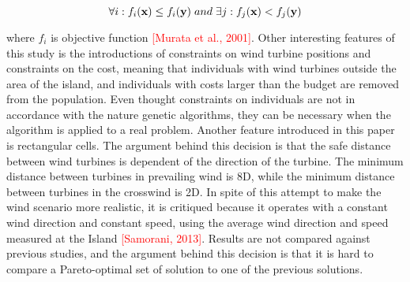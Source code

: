 \begin{equation}
\forall i: f_i(\textbf{x}) \leq f_i(\textbf{y}) \hspace{1mm} and \hspace{1mm} \exists j: f_j(\textbf{x}) < f_j(\textbf{y}) 
\label{Dominated solutions}
\end{equation}

where $f_i$ is objective function \textcolor{red}{[Murata et al., 2001]}. Other interesting features of this study is the introductions of constraints on wind turbine positions and constraints on the cost, meaning that individuals with wind turbines outside the area of the island, and individuals with costs larger than the budget are removed from the population. Even thought constraints on individuals are not in accordance with the nature genetic algorithms, they can be necessary when the algorithm is applied to a real problem. Another feature introduced in this paper is rectangular cells. The argument behind this decision is that the safe distance between wind turbines is dependent of the direction of the turbine. The minimum distance between turbines in prevailing wind is 8D, while the minimum distance between turbines in the crosswind is 2D. In spite of this attempt to make the wind scenario more realistic, it is critiqued because it operates with a constant wind direction and constant speed, using the average wind direction and speed measured at the Island \textcolor{red}{[Samorani, 2013]}. Results are not compared against previous studies, and the argument behind this decision is that it is hard to compare a Pareto-optimal set of solution to one of the previous solutions. \\


